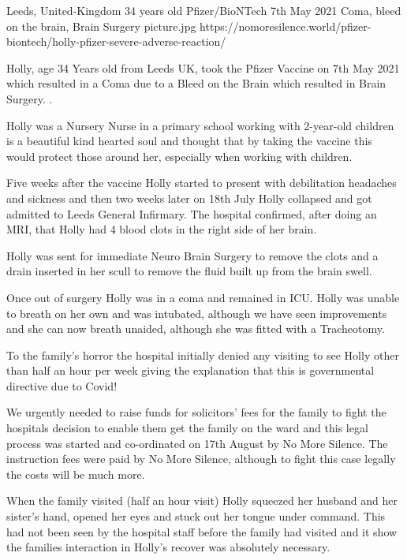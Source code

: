 {Leeds, United-Kingdom}
{34 years old}
{Pfizer/BioNTech}
{7th May 2021}
{Coma, bleed on the brain, Brain Surgery}
{picture.jpg}
{https://nomoresilence.world/pfizer-biontech/holly-pfizer-severe-adverse-reaction/}
{

Holly, age 34 Years old from Leeds UK, took the Pfizer Vaccine on 7th May 2021
which resulted in a Coma due to a Bleed on the Brain which resulted in Brain
Surgery. .

Holly was a Nursery Nurse in a primary school working with 2-year-old children
is a beautiful kind hearted soul and thought that by taking the vaccine this
would protect those around her, especially when working with children.

Five weeks after the vaccine Holly started to present with debilitation
headaches and sickness and then two weeks later on 18th July Holly collapsed and
got admitted to Leeds General Infirmary. The hospital confirmed, after doing an
MRI, that Holly had 4 blood clots in the right side of her brain.

Holly was sent for immediate Neuro Brain Surgery to remove the clots and a drain
inserted in her scull to remove the fluid built up from the brain swell.

Once out of surgery Holly was in a coma and remained in ICU. Holly was unable to
breath on her own and was intubated, although we have seen improvements and she
can now breath unaided, although she was fitted with a Tracheotomy.

To the family’s horror the hospital initially denied any visiting to see Holly
other than half an hour per week giving the explanation that this is
governmental directive due to Covid!

We urgently needed to raise funds for solicitors’ fees for the family to fight
the hospitals decision to enable them get the family on the ward and this legal
process was started and co-ordinated on 17th August by No More Silence. The
instruction fees were paid by No More Silence, although to fight this case
legally the costs will be much more.

When the family visited (half an hour visit) Holly squeezed her husband and her
sister’s hand, opened her eyes and stuck out her tongue under command. This had
not been seen by the hospital staff before the family had visited and it show
the families interaction in Holly’s recover was absolutely necessary.

}
